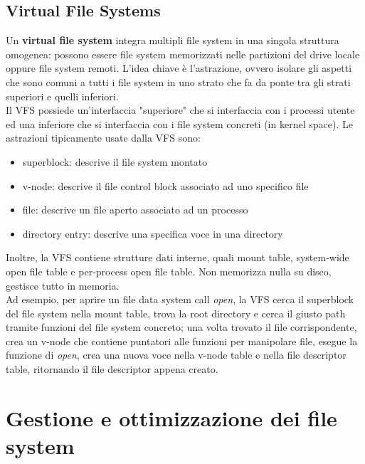 \documentclass[12pt]{article}
\begin{document}
\subsection{Virtual File Systems}
Un \textbf{virtual file system} integra multipli file system in una singola struttura omogenea: possono essere file 
system memorizzati nelle partizioni del drive locale oppure file system remoti. L'idea chiave è l'astrazione, ovvero 
isolare gli aspetti che sono comuni a tutti i file system in uno strato che fa da ponte tra gli strati superiori e
quelli inferiori.\\
Il VFS possiede un'interfaccia "superiore" che si interfaccia con i processi utente ed una inferiore che si interfaccia 
con i file system concreti (in kernel space). Le astrazioni tipicamente usate dalla VFS sono:
\begin{itemize}
    \item superblock: descrive il file system  montato
    \item v-node: descrive il file control block associato ad uno specifico file
    \item file: descrive un file aperto associato ad un processo
    \item directory entry: descrive una specifica voce in una directory
\end{itemize}
Inoltre, la VFS contiene strutture dati interne, quali mount table, system-wide open file table e per-process open file
table. Non memorizza nulla su disco, gestisce tutto in memoria.\\
Ad esempio, per aprire un file data system call \textit{open}, la VFS cerca il superblock del file system nella mount 
table, trova la root directory e cerca il giusto path tramite funzioni del file system concreto; una volta trovato il 
file corrispondente, crea un v-node che contiene puntatori alle funzioni per manipolare file, esegue la funzione di
\textit{open}, crea una nuova voce nella v-node table e nella file descriptor table, ritornando il file descriptor
appena creato.
\section{Gestione e ottimizzazione dei file system}
\end{document}
